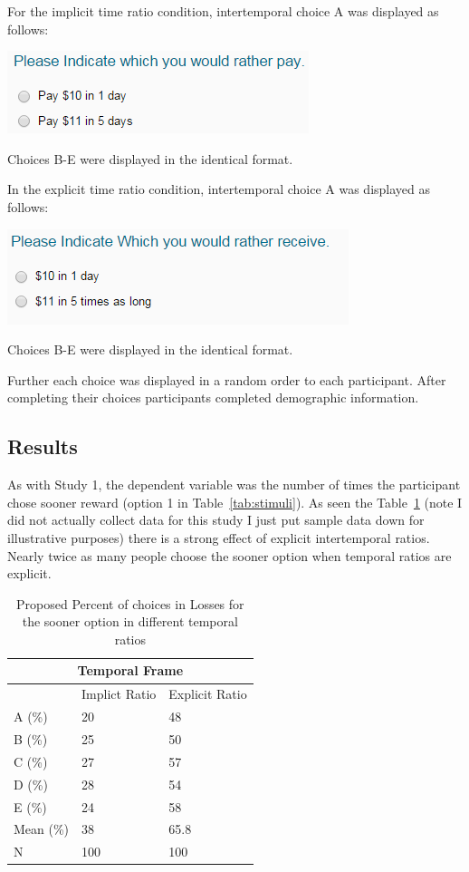 \documentclass[]{article}
\begin{document}
For the implicit time ratio condition, intertemporal choice A was displayed as follows: 

\includegraphics[]{study2_implicit}

Choices B-E were displayed in the identical format. 

In the explicit time ratio condition, intertemporal choice A was displayed as follows:

\includegraphics[]{study2_explicit}

Choices B-E were displayed in the identical format. 

Further each choice was displayed in a random order to each participant. 
After completing their choices participants completed demographic information.


\subsection{Results}

As with Study 1, the dependent variable was the number of times the participant chose sooner reward (option 1 in Table~\ref{tab:stimuli}). 
As seen the Table~\ref{tab:study2results} (note I did not actually collect data for this study I just put sample data down for illustrative purposes) there is a strong effect of explicit intertemporal ratios. 
Nearly twice as many people choose the sooner option when temporal ratios are explicit.


\begin{table}[!ht]
	\caption{Proposed Percent of choices in Losses for the sooner option in different temporal ratios} 
	\label{tab:study2results}
	\begin{tabular}{ p{3cm}||p{3cm}|p{3cm}  }
		\multicolumn{3}{|c|}{Temporal Frame} \\
		\hline
		& Implict Ratio & Explicit Ratio\\
		\hline
		A (\%)	 & 20  & 48\\
		B (\%) 	 & 25  & 50\\
		C (\%) 	 & 27  & 57\\
		D (\%)   & 28  & 54\\
		E (\%)   & 24  & 58\\
		Mean (\%) & 38  & 65.8 \\
		N  	 & 100  & 100\\
		\hline
		
	\end{tabular}
\end{table}
\end{document}
